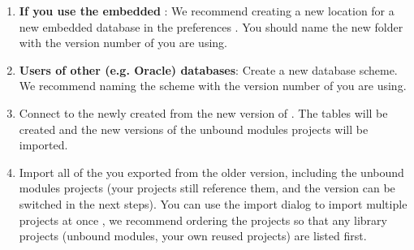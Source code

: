 \begin{enumerate}
\item \textbf{If you use the embedded \gddb{}}: We recommend creating a new location for a new embedded database in the preferences . You should name the new folder with the version number of \app{} you are using. 
\item \textbf{Users of other (e.g. Oracle) databases}: Create a new database scheme. We recommend naming the scheme with the version number of \app{} you are using. 
\item Connect to the newly created \gddb{} from the new version of \app{}. The \gddb{} tables will be created and the new versions of the unbound modules projects will be imported.  
\item Import all of the \gdprojects{} you exported from the older version, including the unbound modules projects (your projects still reference them, and the version can be switched in the next steps). You can use the import dialog to import multiple projects at once , we recommend ordering the projects so that any library projects (unbound modules, your own reused projects) are listed first.
\end{enumerate}
